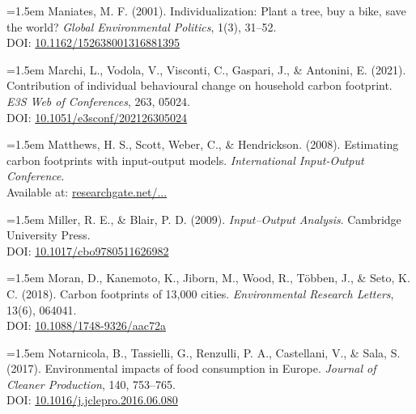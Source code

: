 \documentclass[12pt,a4paper]{article}%
\begin{document}
\vspace{0.5em}
{\small
\noindent
\parbox{\linewidth}{
\hangindent=1.5em
Maniates, M. F. (2001). Individualization: Plant a tree, buy a bike, save the world? \textit{Global Environmental Politics}, 1(3), 31–52. \\
DOI: \href{https://doi.org/10.1162/152638001316881395}{10.1162/152638001316881395}
}
}

\vspace{0.5em}
{\small
\noindent
\parbox{\linewidth}{
\hangindent=1.5em
Marchi, L., Vodola, V., Visconti, C., Gaspari, J., \& Antonini, E. (2021). Contribution of individual behavioural change on household carbon footprint. \textit{E3S Web of Conferences}, 263, 05024. \\
DOI: \href{https://doi.org/10.1051/e3sconf/202126305024}{10.1051/e3sconf/202126305024}
}
}

\vspace{0.5em}
{\small
\noindent
\parbox{\linewidth}{
\hangindent=1.5em
Matthews, H. S., Scott, Weber, C., \& Hendrickson. (2008). Estimating carbon footprints with input-output models. \textit{International Input-Output Conference}. \\
Available at: \href{https://www.researchgate.net/publication/228905894_Estimating_carbon_footprints_with_input-output_models}{researchgate.net/...}
}
}

\vspace{0.5em}
{\small
\noindent
\parbox{\linewidth}{
\hangindent=1.5em
Miller, R. E., \& Blair, P. D. (2009). \textit{Input–Output Analysis}. Cambridge University Press. \\
DOI: \href{https://doi.org/10.1017/cbo9780511626982}{10.1017/cbo9780511626982}
}
}

\vspace{0.5em}
{\small
\noindent
\parbox{\linewidth}{
\hangindent=1.5em
Moran, D., Kanemoto, K., Jiborn, M., Wood, R., Többen, J., \& Seto, K. C. (2018). Carbon footprints of 13,000 cities. \textit{Environmental Research Letters}, 13(6), 064041. \\
DOI: \href{https://doi.org/10.1088/1748-9326/aac72a}{10.1088/1748-9326/aac72a}
}
}

\vspace{0.5em}
{\small
\noindent
\parbox{\linewidth}{
\hangindent=1.5em
Notarnicola, B., Tassielli, G., Renzulli, P. A., Castellani, V., \& Sala, S. (2017). Environmental impacts of food consumption in Europe. \textit{Journal of Cleaner Production}, 140, 753–765. \\
DOI: \href{https://doi.org/10.1016/j.jclepro.2016.06.080}{10.1016/j.jclepro.2016.06.080}
}
}
\end{document}
